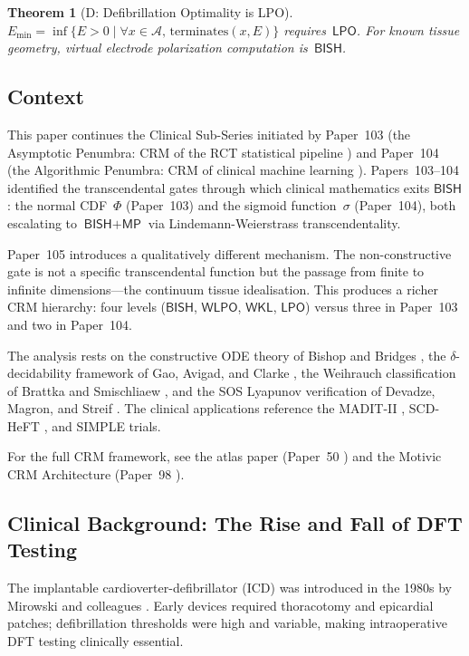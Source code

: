 \documentclass[11pt,a4paper]{article}
\theoremstyle{plain}
\newtheorem{theorem}{Theorem}[section]
\theoremstyle{definition}
\newcommand{\BISH}{\textsf{BISH}}
\newcommand{\WKL}{\textsf{WKL}}
\newcommand{\WLPO}{\textsf{WLPO}}
\newcommand{\LPO}{\textsf{LPO}}
\newcommand{\MP}{\textsf{MP}}
\begin{document}
\begin{theorem}[D: Defibrillation Optimality is LPO]\label{thm:D}
$E_{\min} = \inf\{E > 0 \mid \forall x \in \mathcal{A},\, \mathrm{terminates}(x,E)\}$ requires~$\LPO$.  For known tissue geometry, virtual electrode polarization computation is~$\BISH$.
\end{theorem}

\subsection{Context}

This paper continues the Clinical Sub-Series initiated by Paper~103 (the Asymptotic Penumbra: CRM of the RCT statistical pipeline \cite{p103}) and Paper~104 (the Algorithmic Penumbra: CRM of clinical machine learning \cite{p104}).  Papers~103--104 identified the transcendental gates through which clinical mathematics exits $\BISH$: the normal CDF~$\Phi$ (Paper~103) and the sigmoid function~$\sigma$ (Paper~104), both escalating to $\BISH + \MP$ via Lindemann-Weierstrass transcendentality.

Paper~105 introduces a qualitatively different mechanism.  The non-constructive gate is not a specific transcendental function but the passage from finite to infinite dimensions---the continuum tissue idealisation.  This produces a richer CRM hierarchy: four levels ($\BISH$, $\WLPO$, $\WKL$, $\LPO$) versus three in Paper~103 and two in Paper~104.

The analysis rests on the constructive ODE theory of Bishop and Bridges \cite{bishop1985}, the $\delta$-decidability framework of Gao, Avigad, and Clarke \cite{gao2012}, the Weihrauch classification of Brattka and Smischliaew \cite{brattka2024}, and the SOS Lyapunov verification of Devadze, Magron, and Streif \cite{devadze2025}.  The clinical applications reference the MADIT-II \cite{madit2}, SCD-HeFT \cite{scdheft}, and SIMPLE \cite{simple2013} trials.

For the full CRM framework, see the atlas paper (Paper~50 \cite{p50}) and the Motivic CRM Architecture (Paper~98 \cite{p98}).

\subsection{Clinical Background: The Rise and Fall of DFT Testing}

The implantable cardioverter-defibrillator (ICD) was introduced in the 1980s by Mirowski and colleagues \cite{mirowski1980}.  Early devices required thoracotomy and epicardial patches; defibrillation thresholds were high and variable, making intraoperative DFT testing clinically essential.
\end{document}
